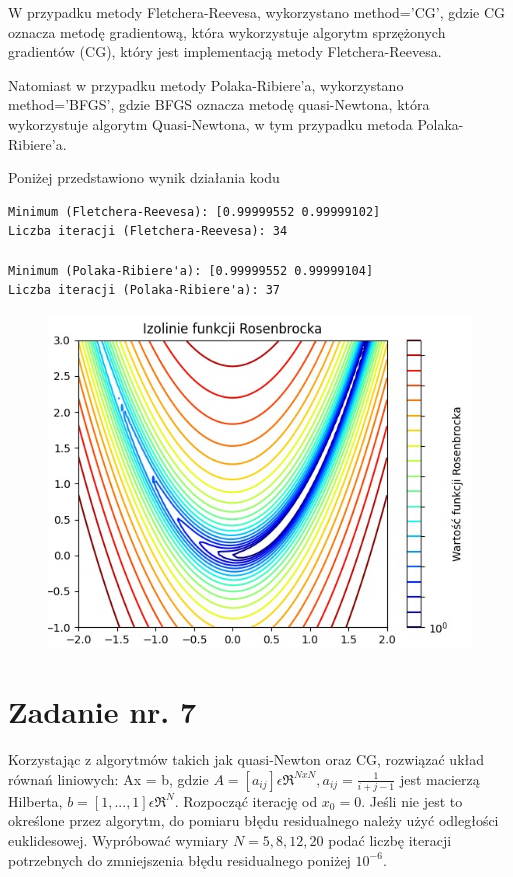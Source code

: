 \documentclass{article}
\begin{document}
W przypadku metody Fletchera-Reevesa, wykorzystano method='CG', gdzie CG oznacza metodę gradientową, 
która wykorzystuje algorytm sprzężonych gradientów (CG), który jest implementacją metody Fletchera-Reevesa.

Natomiast w przypadku metody Polaka-Ribiere'a, wykorzystano method='BFGS', gdzie BFGS oznacza metodę quasi-Newtona, 
która wykorzystuje algorytm Quasi-Newtona, w tym przypadku metoda Polaka-Ribiere'a.

Poniżej przedstawiono wynik działania kodu

\begin{lstlisting}
Minimum (Fletchera-Reevesa): [0.99999552 0.99999102]
Liczba iteracji (Fletchera-Reevesa): 34

Minimum (Polaka-Ribiere'a): [0.99999552 0.99999104]
Liczba iteracji (Polaka-Ribiere'a): 37
\end{lstlisting}

\begin{figure}[h]
   \includegraphics[scale=0.7]{zad6.jpg}
   \centering
\end{figure}

\section{Zadanie nr. 7}

Korzystając z algorytmów takich jak quasi-Newton oraz CG, rozwiązać układ
równań liniowych: Ax = b, gdzie $A=[a_{ij}] \epsilon \mathfrak{R}^{NxN}, a_{ij} = \frac{1}{i+j-1}$ jest macierzą
Hilberta, $b = [1, ..., 1] \epsilon \mathfrak{R}^N$. Rozpocząć iterację od $x_0 = 0$. Jeśli nie jest to
określone przez algorytm, do pomiaru błędu residualnego należy użyć odległości
euklidesowej. Wypróbować wymiary $N = 5, 8, 12, 20$ podać liczbę iteracji
potrzebnych do zmniejszenia błędu residualnego poniżej $10^{-6}$.\\
\end{document}
